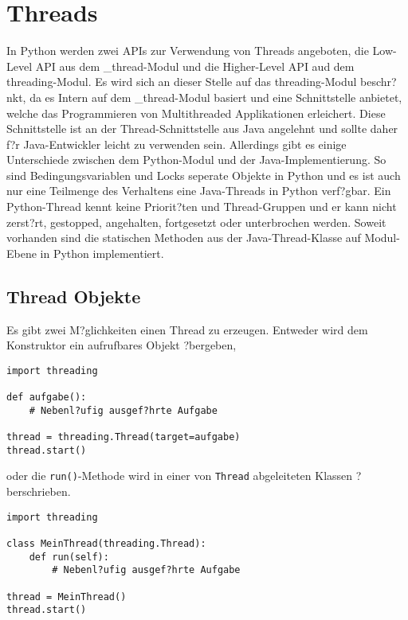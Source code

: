 \section{Threads}

\label{threads}

In Python werden zwei APIs zur Verwendung von Threads angeboten, die Low-Level API aus dem \_thread-Modul und die Higher-Level API aud dem threading-Modul. Es wird sich an dieser Stelle auf das threading-Modul beschr?nkt, da es Intern auf dem \_thread-Modul basiert und eine Schnittstelle anbietet, welche das Programmieren von Multithreaded Applikationen erleichert. Diese Schnittstelle ist an der Thread-Schnittstelle aus Java angelehnt und sollte daher f?r Java-Entwickler leicht zu verwenden sein. Allerdings gibt es einige Unterschiede zwischen dem Python-Modul und der Java-Implementierung. So sind Bedingungsvariablen und Locks seperate Objekte in Python und es ist auch nur eine Teilmenge des Verhaltens eine Java-Threads in Python verf?gbar. Ein Python-Thread kennt keine Priorit?ten und Thread-Gruppen und er kann nicht zerst?rt, gestopped, angehalten, fortgesetzt oder unterbrochen werden. Soweit vorhanden sind die statischen Methoden aus der Java-Thread-Klasse auf Modul-Ebene in Python implementiert.

\subsection{Thread Objekte}

Es gibt zwei M?glichkeiten einen Thread zu erzeugen. Entweder wird dem Konstruktor ein aufrufbares Objekt ?bergeben,
\begin{lstlisting}
import threading

def aufgabe():
    # Nebenl?ufig ausgef?hrte Aufgabe

thread = threading.Thread(target=aufgabe)
thread.start()
\end{lstlisting}
oder die \lstinline!run()!-Methode wird in einer von \lstinline!Thread! abgeleiteten Klassen ?berschrieben.
\begin{lstlisting}
import threading

class MeinThread(threading.Thread):
    def run(self):
        # Nebenl?ufig ausgef?hrte Aufgabe

thread = MeinThread()
thread.start()
\end{lstlisting}


